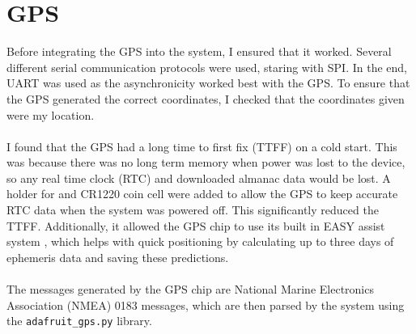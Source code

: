 \documentclass[12pt,a4paper]{report}
\begin{document}
\section{GPS} 
Before integrating the GPS into the system, I ensured that it worked. Several different serial communication protocols were used, staring with SPI. In the end, UART was used as the asynchronicity worked best with the GPS. To ensure that the GPS generated the correct coordinates, I checked that the coordinates given were my location. \\ \\ 
I found that the GPS had a long time to first fix (TTFF) on a cold start. This was because there was no long term memory when power was lost to the device, so any real time clock (RTC) and downloaded almanac data would be lost. A holder for and CR1220 coin cell were added to allow the GPS to keep accurate RTC data when the system was powered off. This significantly reduced the TTFF. Additionally, it allowed the GPS chip to use its built in EASY assist system \cite{gpsdata}, which helps with quick positioning by calculating up to three days of ephemeris data and saving these predictions. \\ \\
The messages generated by the GPS chip are National Marine Electronics Association (NMEA) 0183 messages, which are then parsed by the system using the \verb'adafruit_gps.py' library. \\
\end{document}
